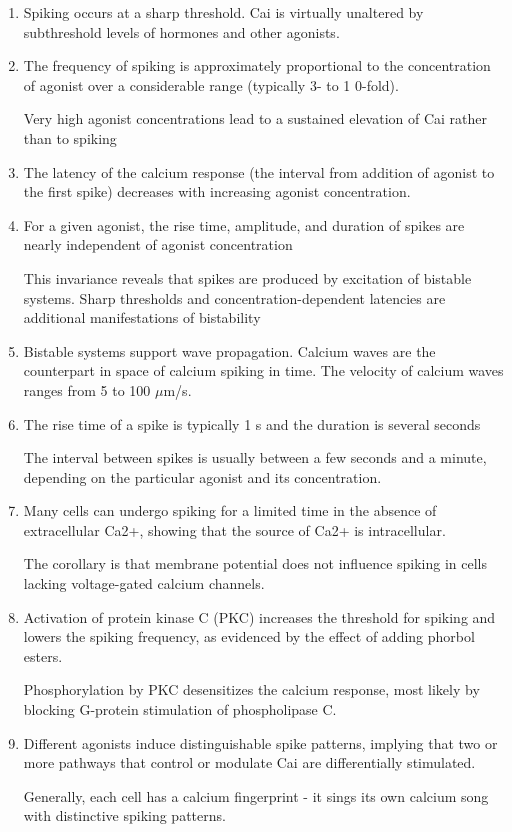 \begin{enumerate}
  \item Spiking occurs at a sharp threshold. Cai is virtually unaltered by subthreshold
levels of hormones and other agonists.

  \item The frequency of spiking is approximately proportional to the
  concentration of agonist over a considerable range (typically 3- to 1 0-fold).

Very high agonist concentrations lead to a sustained elevation of Cai
rather than to spiking
  
  \item The latency of the calcium response (the interval from addition of
agonist to the first spike) decreases with increasing agonist concentration.

  \item For a given agonist, the rise time, amplitude, and duration of spikes
are nearly independent of agonist concentration

This invariance reveals that spikes are produced by excitation of bistable
systems. Sharp thresholds and concentration-dependent latencies are additional
manifestations of bistability

  \item Bistable systems support wave propagation. Calcium waves are the
counterpart in space of calcium spiking in time. The velocity of calcium
waves ranges from 5 to 100 $\mu$m/s.

  \item The rise time of a spike is typically 1 s and the duration is several
seconds

The interval between spikes is usually between a few seconds and a minute,
depending on the particular agonist and its concentration.

  \item  Many cells can undergo spiking for a limited time in the absence
of extracellular Ca2+, showing that the source of Ca2+ is
intracellular.

The corollary is that membrane potential does not influence spiking in cells
lacking voltage-gated calcium channels.

  \item  Activation of protein kinase C (PKC) increases the threshold for spiking
and lowers the spiking frequency, as evidenced by the effect of adding phorbol
esters. 

Phosphorylation by PKC desensitizes the calcium response, most likely by
blocking G-protein stimulation of phospholipase C.
  
  \item Different agonists induce distinguishable spike patterns, implying
that two or more pathways that control or modulate Cai are differentially
stimulated.

Generally, each cell has a calcium fingerprint - it sings its own calcium song
with distinctive spiking patterns.

\end{enumerate}

